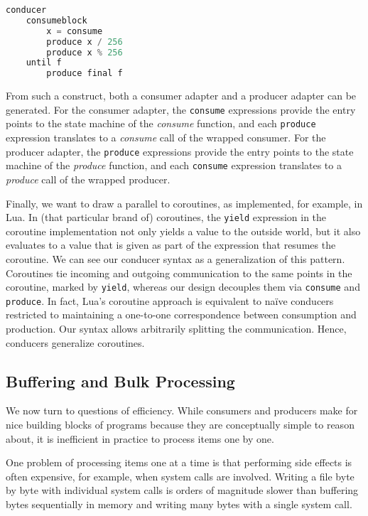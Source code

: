 \documentclass[sigplan,screen,10pt,review]{acmart}
\begin{document}
\begin{lstlisting}[language=Python]
conducer
    consumeblock
        x = consume
        produce x / 256
        produce x % 256
    until f
        produce final f
\end{lstlisting}

From such a construct, both a consumer adapter and a producer adapter can be generated. For the consumer adapter, the \texttt{consume} expressions provide the entry points to the state machine of the \textit{consume} function, and each \texttt{produce} expression translates to a \textit{consume} call of the wrapped consumer. For the producer adapter, the \texttt{produce} expressions provide the entry points to the state machine of the \textit{produce} function, and each \texttt{consume} expression translates to a \textit{produce} call of the wrapped producer.


Finally, we want to draw a parallel to coroutines\cite{moura2009revisiting}, as implemented, for example, in Lua\cite{ierusalimschy2006programming}. In (that particular brand of) coroutines, the \texttt{yield} expression in the coroutine implementation not only yields a value to the outside world, but it also evaluates to a value that is given as part of the expression that resumes the coroutine. We can see our conducer syntax as a generalization of this pattern. Coroutines tie incoming and outgoing communication to the same points in the coroutine, marked by \texttt{yield}, whereas our design decouples them via \texttt{consume} and \texttt{produce}. In fact, Lua's coroutine approach is equivalent to naïve conducers restricted to maintaining a one-to-one correspondence between consumption and production. Our syntax allows arbitrarily splitting the communication. Hence, conducers generalize coroutines.

\subsection{Buffering and Bulk Processing}\label{bulk}

We now turn to questions of efficiency. While consumers and producers make for nice building blocks of programs because they are conceptually simple to reason about, it is inefficient in practice to process items one by one.

One problem of processing items one at a time is that performing side effects is often expensive, for example, when system calls are involved. Writing a file byte by byte with individual system calls is orders of magnitude slower than buffering bytes sequentially in memory and writing many bytes with a single system call.
\end{document}
